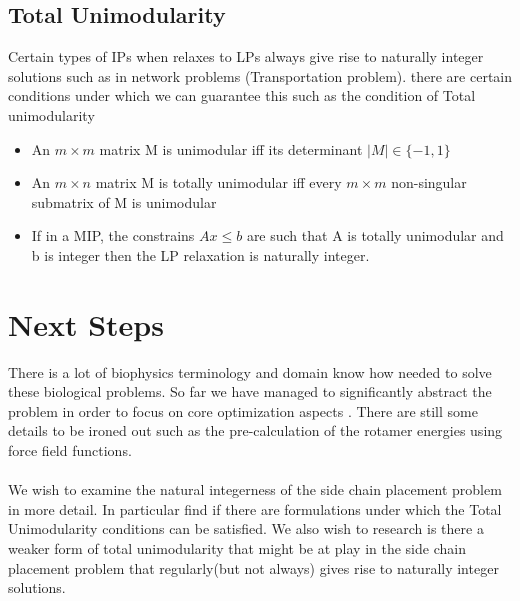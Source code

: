 \documentclass{article} %
\begin{document}
\subsection{Total Unimodularity}
Certain types of IPs when relaxes to LPs always give rise to naturally integer solutions such as in network problems (Transportation problem). there are certain conditions under which we can guarantee this such as the condition of Total unimodularity
\begin{itemize}
\item An $m \times m$ matrix M is unimodular iff its determinant $|M| \in \{-1,1\}$
\item  An $m \times n$ matrix M is totally unimodular iff every $m \times m$ non-singular submatrix of M  is unimodular
\item If in a MIP, the constrains $Ax \leq b$ are such that A is totally unimodular and b is integer then the LP relaxation is naturally integer.
\end{itemize}

\section{Next Steps}
There is a lot of biophysics terminology and domain know how needed to solve these biological problems. So far we have managed to significantly abstract the problem in order to focus on core optimization aspects . There are still some details to be ironed out such as the pre-calculation of the rotamer energies using force field functions. 

\paragraph*{} We wish to examine the natural integerness of the side chain placement problem in more detail. In particular find if there are formulations under which the Total Unimodularity conditions can be satisfied. We also wish to research is there a weaker form of total unimodularity that might be at play in the side chain placement problem that regularly(but not always) gives rise to naturally integer solutions.  
\end{document}
